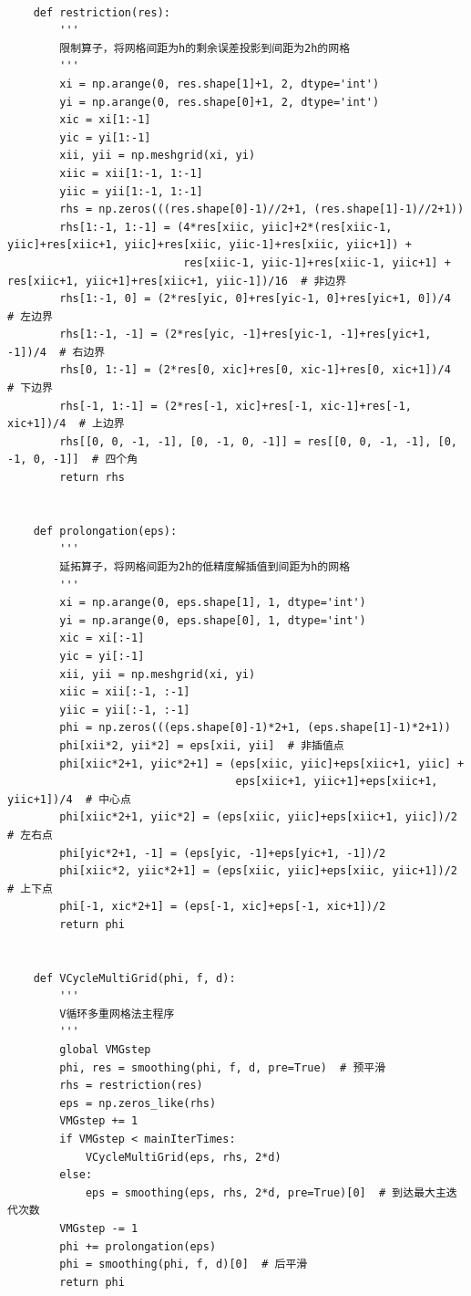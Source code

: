 \documentclass{article} %
\begin{document}
\begin{lstlisting}
    
    def restriction(res):
        '''
        限制算子，将网格间距为h的剩余误差投影到间距为2h的网格
        '''
        xi = np.arange(0, res.shape[1]+1, 2, dtype='int')
        yi = np.arange(0, res.shape[0]+1, 2, dtype='int')
        xic = xi[1:-1]
        yic = yi[1:-1]
        xii, yii = np.meshgrid(xi, yi)
        xiic = xii[1:-1, 1:-1]
        yiic = yii[1:-1, 1:-1]
        rhs = np.zeros(((res.shape[0]-1)//2+1, (res.shape[1]-1)//2+1))
        rhs[1:-1, 1:-1] = (4*res[xiic, yiic]+2*(res[xiic-1, yiic]+res[xiic+1, yiic]+res[xiic, yiic-1]+res[xiic, yiic+1]) +
                           res[xiic-1, yiic-1]+res[xiic-1, yiic+1] + res[xiic+1, yiic+1]+res[xiic+1, yiic-1])/16  # 非边界
        rhs[1:-1, 0] = (2*res[yic, 0]+res[yic-1, 0]+res[yic+1, 0])/4  # 左边界
        rhs[1:-1, -1] = (2*res[yic, -1]+res[yic-1, -1]+res[yic+1, -1])/4  # 右边界
        rhs[0, 1:-1] = (2*res[0, xic]+res[0, xic-1]+res[0, xic+1])/4  # 下边界
        rhs[-1, 1:-1] = (2*res[-1, xic]+res[-1, xic-1]+res[-1, xic+1])/4  # 上边界
        rhs[[0, 0, -1, -1], [0, -1, 0, -1]] = res[[0, 0, -1, -1], [0, -1, 0, -1]]  # 四个角
        return rhs
    
    
    def prolongation(eps):
        '''
        延拓算子，将网格间距为2h的低精度解插值到间距为h的网格
        '''
        xi = np.arange(0, eps.shape[1], 1, dtype='int')
        yi = np.arange(0, eps.shape[0], 1, dtype='int')
        xic = xi[:-1]
        yic = yi[:-1]
        xii, yii = np.meshgrid(xi, yi)
        xiic = xii[:-1, :-1]
        yiic = yii[:-1, :-1]
        phi = np.zeros(((eps.shape[0]-1)*2+1, (eps.shape[1]-1)*2+1))
        phi[xii*2, yii*2] = eps[xii, yii]  # 非插值点
        phi[xiic*2+1, yiic*2+1] = (eps[xiic, yiic]+eps[xiic+1, yiic] +
                                   eps[xiic+1, yiic+1]+eps[xiic+1, yiic+1])/4  # 中心点
        phi[xiic*2+1, yiic*2] = (eps[xiic, yiic]+eps[xiic+1, yiic])/2  # 左右点
        phi[yic*2+1, -1] = (eps[yic, -1]+eps[yic+1, -1])/2
        phi[xiic*2, yiic*2+1] = (eps[xiic, yiic]+eps[xiic, yiic+1])/2  # 上下点
        phi[-1, xic*2+1] = (eps[-1, xic]+eps[-1, xic+1])/2
        return phi
    
    
    def VCycleMultiGrid(phi, f, d):
        '''
        V循环多重网格法主程序
        '''
        global VMGstep
        phi, res = smoothing(phi, f, d, pre=True)  # 预平滑
        rhs = restriction(res)
        eps = np.zeros_like(rhs)
        VMGstep += 1
        if VMGstep < mainIterTimes:
            VCycleMultiGrid(eps, rhs, 2*d)
        else:
            eps = smoothing(eps, rhs, 2*d, pre=True)[0]  # 到达最大主迭代次数
        VMGstep -= 1
        phi += prolongation(eps)
        phi = smoothing(phi, f, d)[0]  # 后平滑
        return phi
    

\end{lstlisting}
\end{document}
